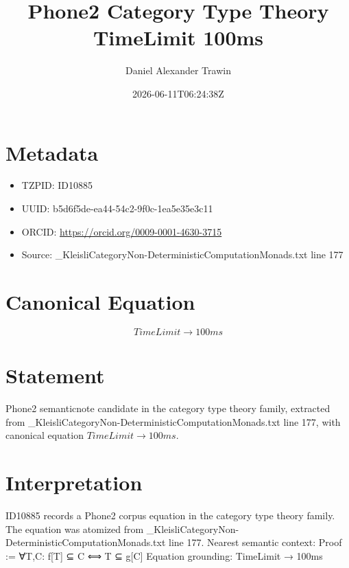 \documentclass[11pt]{article}
\title{Phone2 Category Type Theory TimeLimit 100ms}
\author{Daniel Alexander Trawin}
\date{2026-06-11T06:24:38Z}
\begin{document}
\maketitle
\section*{Metadata}
\begin{itemize}
\item TZPID: ID10885
\item UUID: b5d6f5de-ea44-54c2-9f0c-1ea5e35e3c11
\item ORCID: \url{https://orcid.org/0009-0001-4630-3715}
\item Source: _KleisliCategoryNon-DeterministicComputationMonads.txt line 177
\end{itemize}
\section*{Canonical Equation}
\[
TimeLimit → 100ms
\]
\section*{Statement}
Phone2 semanticnote candidate in the category type theory family, extracted from _KleisliCategoryNon-DeterministicComputationMonads.txt line 177, with canonical equation $TimeLimit → 100ms$.
\section*{Interpretation}
ID10885 records a Phone2 corpus equation in the category type theory family. The equation was atomized from _KleisliCategoryNon-DeterministicComputationMonads.txt line 177. Nearest semantic context: Proof := ∀T,C: f[T] ⊆ C ⟺ T ⊆ g[C] Equation grounding: TimeLimit → 100ms
\end{document}
